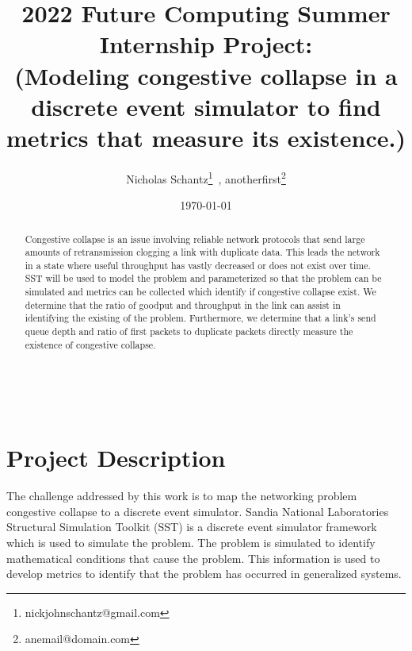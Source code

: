 \documentclass{article}
\begin{document}
    \begin{minipage}[h]{\textwidth}
        \title{2022 Future Computing Summer Internship Project:\\(Modeling congestive collapse in a discrete event simulator to find metrics that measure its existence.)}
        \author{Nicholas Schantz\footnote{nickjohnschantz@gmail.com}\ , 
        anotherfirst\footnote{anemail@domain.com}}
        \date{\today}
            \maketitle
        \begin{abstract}
            Congestive collapse is an issue involving reliable network protocols that send large amounts of retransmission clogging a link with duplicate data. This leads the network in a state where useful throughput has vastly decreased or does not exist over time. SST will be used to model the problem and parameterized so that the problem can be simulated and metrics can be collected which identify if congestive collapse exist. We determine that the ratio of goodput and throughput in the link can assist in identifying the existing of the problem. Furthermore, we determine that a link's send queue depth and ratio of first packets to duplicate packets directly measure the existence of congestive collapse.
        \end{abstract}
    \end{minipage}

\ \\


\section{Project Description} %

The challenge addressed by this work is to map the networking problem congestive collapse to a discrete event simulator. Sandia National Laboratories Structural Simulation Toolkit (SST) is a discrete event simulator framework which is used to simulate the problem. The problem is simulated to identify mathematical conditions that cause the problem. This information is used to develop metrics to identify that the problem has occurred in generalized systems.
\end{document}
